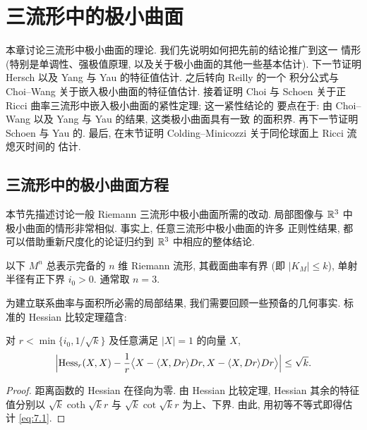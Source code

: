 \chapter{三流形中的极小曲面}
\label{chap:7}

{\setlength{\emergencystretch}{2em}%
本章讨论三流形中极小曲面的理论. 我们先说明如何把先前的结论推广到这一
情形 (特别是单调性、强极值原理, 以及关于极小曲面的其他一些基本估计).
下一节证明 Hersch 以及 Yang 与 Yau 的特征值估计. 之后转向 Reilly 的一个
积分公式与 Choi--Wang 关于嵌入极小曲面的特征值估计. 接着证明 Choi 与
Schoen 关于正 Ricci 曲率三流形中嵌入极小曲面的紧性定理; 这一紧性结论的
要点在于: 由 Choi--Wang 以及 Yang 与 Yau 的结果, 这类极小曲面具有一致
的面积界. 再下一节证明 Schoen 与 Yau 的.
最后, 在末节证明 Colding--Minicozzi 关于同伦球面上 Ricci 流熄灭时间的
估计.\par}

\section{三流形中的极小曲面方程}
\label{sec:7.1}

本节先描述讨论一般 Riemann 三流形中极小曲面所需的改动. 局部图像与
$\mathbb{R}^3$ 中极小曲面的情形非常相似. 事实上, 任意三流形中极小曲面的许多
正则性结果, 都可以借助重新尺度化的论证归约到 $\mathbb{R}^3$ 中相应的整体结论.

以下 $M^n$ 总表示完备的 $n$ 维 Riemann 流形, 其截面曲率有界 (即
$|K_M|\leq k$), 单射半径有正下界 $i_0>0$. 通常取 $n=3$.

为建立联系曲率与面积所必需的局部结果, 我们需要回顾一些预备的几何事实.
标准的 Hessian 比较定理蕴含:

\begin{lemma}
\label{lem:7.1}
对 $r<\min\{i_0,1/\sqrt{k}\}$ 及任意满足 $|X|=1$ 的向量 $X$,
\begin{equation}
\Bigl|\operatorname{Hess}_r(X,X)-\frac1r\bigl\langle X-\langle X,Dr\rangle Dr,
X-\langle X,Dr\rangle Dr\bigr\rangle\Bigr|\leq\sqrt{k}.
\label{eq:7.1}
\end{equation}
\end{lemma}

\begin{proof}
距离函数的 Hessian 在径向为零. 由 Hessian 比较定理, Hessian 其余的特征
值分别以 $\sqrt{k}\coth\sqrt{k}r$ 与 $\sqrt{k}\cot\sqrt{k}r$ 为上、下界.
由此, 用初等不等式即得估计 \eqref{eq:7.1}.
\end{proof}

